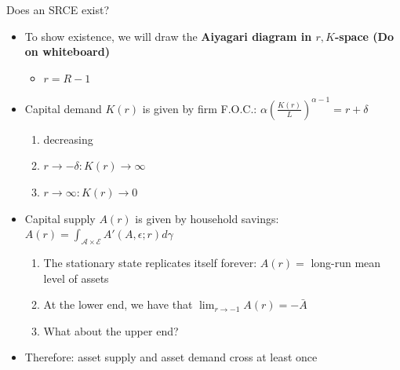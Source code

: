 \documentclass[9pt]{beamer}
\newcommand{\bit}{\begin{itemize}}
\newcommand{\eit}{\end{itemize}}
\newcommand{\ben}{\begin{enumerate}}
\newcommand{\een}{\end{enumerate}}
\newcommand{\rc}{\color{red}}
\begin{document}
\begin{frame}{Does an SRCE exist?}

\bit
\setlength\itemsep{1.5em}

\item To show existence, we will draw the \bf Aiyagari diagram \normalfont in $r,K$-space {\rc (Do on whiteboard)} 
\bit
\item $r = R -1$
\eit

\item Capital demand $K(r)$ is given by firm F.O.C.: $\alpha \left(\frac{K(r)}{L}\right)^{\alpha-1} = r+\delta $
\ben
\setlength\itemsep{0.5em}
\item decreasing
\item $r \to -\delta: K(r) \to \infty$
\item $r \to \infty: K(r) \to  0$
\een

\item Capital supply $A(r)$ is given by household savings: $A(r) = \int_{\bm{\mathcal A} \times \bm{\mathcal E}} A'(A,\epsilon; r) d\gamma $
\ben
\setlength\itemsep{0.5em}
\item The stationary state replicates itself forever: $A(r) = $ long-run mean level of assets  
\item At the lower end, we have that $\lim_{r \to -1} A(r) = - \bar A$
\item What about the upper end?
\een

\item {\color{white} Therefore: asset supply and asset demand cross at least once}

\eit

\end{frame}
\end{document}
